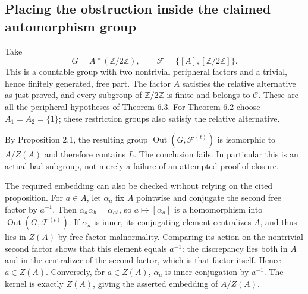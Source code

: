 \documentclass[10pt]{article}
\begin{document}
\subsection*{Placing the obstruction inside the claimed automorphism group}
Take \[G=A*(\mathbb Z/2\mathbb Z),\qquad \mathcal F=\{[A],[\mathbb Z/2\mathbb Z]\}.\] This is a countable group with two nontrivial peripheral factors and a trivial, hence finitely generated, free part. The factor \(A\) satisfies the relative alternative as just proved, and every subgroup of \(\mathbb Z/2\mathbb Z\) is finite and belongs to \(\mathcal C\). These are all the peripheral hypotheses of Theorem 6.3. For Theorem 6.2 choose \(A_1=A_2=\{1\}\); these restriction groups also satisfy the relative alternative.\par
By Proposition 2.1, the resulting group \(\operatorname{Out}(G,\mathcal F^{(t)})\) is isomorphic to \(A/Z(A)\) and therefore contains \(L\). The conclusion fails. In particular this is an actual bad subgroup, not merely a failure of an attempted proof of closure.\par
The required embedding can also be checked without relying on the cited proposition. For \(a\in A\), let \(\alpha_a\) fix \(A\) pointwise and conjugate the second free factor by \(a^{-1}\). Then \(\alpha_a\alpha_b=\alpha_{ab}\), so \(a\mapsto[\alpha_a]\) is a homomorphism into \(\operatorname{Out}(G,\mathcal F^{(t)})\). If \(\alpha_a\) is inner, its conjugating element centralizes \(A\), and thus lies in \(Z(A)\) by free-factor malnormality. Comparing its action on the nontrivial second factor shows that this element equals \(a^{-1}\): the discrepancy lies both in \(A\) and in the centralizer of the second factor, which is that factor itself. Hence \(a\in Z(A)\). Conversely, for \(a\in Z(A)\), \(\alpha_a\) is inner conjugation by \(a^{-1}\). The kernel is exactly \(Z(A)\), giving the asserted embedding of \(A/Z(A)\).\par
\end{document}
